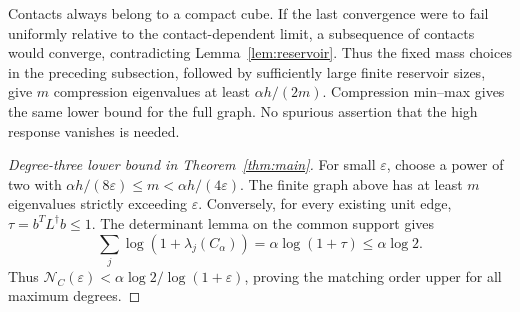 \documentclass[11pt]{article}
\newcommand{\N}{\mathcal N}
\begin{document}
Contacts always belong to a compact cube. If the last convergence
were to fail uniformly relative to the contact-dependent limit, a
subsequence of contacts would converge, contradicting
Lemma~\ref{lem:reservoir}. Thus the fixed mass choices in the preceding
subsection, followed by sufficiently large finite reservoir sizes,
give $m$ compression eigenvalues at least $\alpha h/(2m)$.
Compression min--max gives the same lower bound for the full graph.
No spurious assertion that the high response vanishes is needed.

\begin{proof}[Degree-three lower bound in Theorem~\ref{thm:main}]
For small $\varepsilon$, choose a power of two with
$\alpha h/(8\varepsilon)\le m<\alpha h/(4\varepsilon)$.
The finite graph above has at least $m$ eigenvalues strictly exceeding
$\varepsilon$.
Conversely, for every existing unit edge, $\tau=b^TL^\dagger b\le1$.
The determinant lemma on the common support gives
\[
 \sum_j\log(1+\lambda_j(C_\alpha))=\alpha\log(1+\tau)\le\alpha\log2.
\]
Thus $\N_C(\varepsilon)<\alpha\log2/\log(1+\varepsilon)$, proving
the matching order upper for all maximum degrees.
\end{proof}
\end{document}
